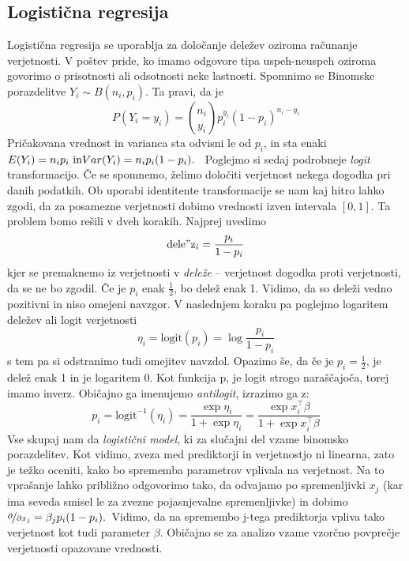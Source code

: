 \documentclass[12pt,a4paper]{amsart}
\theoremstyle{definition} %
\theoremstyle{plain} %
\begin{document}
\subsection{Logistična regresija}
Logistična regresija se uporablja za določanje deležev oziroma računanje verjetnosti. V poštev pride, ko imamo odgovore tipa uspeh-neuspeh oziroma
govorimo o prisotnosti ali odsotnosti neke lastnosti.
Spomnimo se Binomske porazdelitve $Y_{i} \sim B(n_{i}, p_{i})$. Ta pravi, da je 
\[
    P(Y_{i} = y_{i}) = {n_{i} \choose y_{i}} p_{i}^{y_{i}}(1 - p_{i}) ^{n_{i} - y_{i}}
\]
Pričakovana vrednost in varianca sta odvisni le od $p_{i}$, in sta enaki $E(Y_{i}) = n_{i}p_{i} \text{~in}\\Var(Y_{i}) = n_{i}p_{i}(1 - p_{i}).$~
Poglejmo si sedaj podrobneje \textit{logit} transformacijo. Če se spomnemo, želimo določiti verjetnost nekega dogodka pri danih podatkih. Ob uporabi
identitente transformacije se nam kaj hitro lahko zgodi, da za posamezne verjetnosti dobimo vrednosti izven intervala $[0,1]$. Ta problem bomo rešili v 
dveh korakih.
Najprej uvedimo 
\[ 
    \mathrm{dele"z}_{i} = \frac{p_{i}}{1 - p_{i}} %
\]
kjer se premaknemo iz verjetnosti v \textit{deleže} -- verjetnost dogodka proti verjetnosti, da se ne bo zgodil. Če je $p_{i}$ enak $\frac{1}{2}$, 
bo delež enak 1. Vidimo, da so deleži vedno pozitivni in niso omejeni navzgor.
V naslednjem koraku pa poglejmo logaritem deležev ali logit verjetnosti
\[
    \eta_{i} = \mathrm{logit}(p_{i}) = \log \frac{p_{i}}{1 - p_{i}}
\]
s tem pa si odstranimo tudi omejitev navzdol. Opazimo še, da če je $p_{i} = \frac{1}{2}$, je delež enak 1 in je logaritem 0. Kot funkcija p, je logit
strogo naraščajoča, torej imamo inverz. Običajno ga imenujemo \textit{antilogit}, izrazimo ga z:
\[
    p_{i} = \mathrm{logit}^{-1}(\eta_{i}) = \frac{\exp{\eta_{i}}}{1+\exp{\eta_{i}}} = \frac{\exp{x_{i}^\top\beta}}{1+\exp{x_{i}^\top\beta}}
\]
Vse skupaj nam da \textit{logistični model}, ki za slučajni del vzame binomsko porazdelitev. %
Kot vidimo, zveza med prediktorji in verjetnostjo ni linearna, zato je težko oceniti, kako bo sprememba parametrov
vplivala na verjetnost. Na to vprašanje lahko približno odgovorimo tako, da odvajamo po spremenljivki $x_{j}$ (kar ima seveda smisel le za zvezne
pojasnjevalne spremenljivke) in dobimo $\nicefrac{\partial}{\partial x_{j}} = \beta_{j}p_{i}(1 - p_{i}).$~Vidimo, da na spremembo j-tega prediktorja
vpliva tako verjetnost kot tudi parameter $\beta$. Običajno se za analizo vzame vzorčno povprečje verjetnosti opazovane vrednosti.
\end{document}
